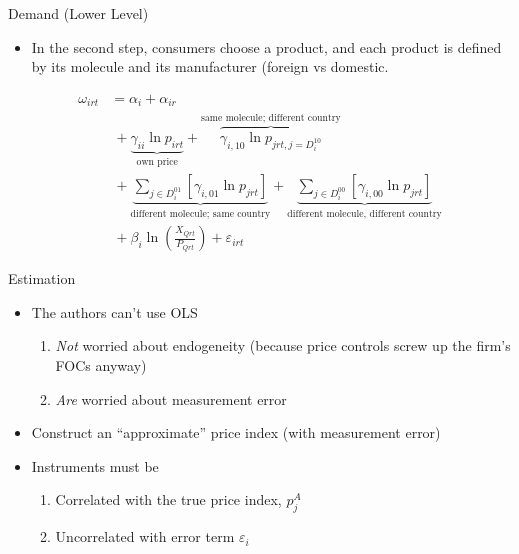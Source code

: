 \documentclass{beamer}
\begin{document}
%
\begin{frame}{Demand (Lower Level)}
  \begin{itemize}
  \item In the second step, consumers choose a product, and each product is defined by its molecule and its manufacturer (foreign vs domestic.
  \end{itemize}
  \begin{align*}
    \omega_{irt} &= \alpha_i + \alpha_{ir} \\
                 &\ + \underbrace{\gamma_{ii} \ln  p_{irt}}_{\text{own price}} + \overbrace{\gamma_{i, 10} \ln p_{jrt, j = D_i^{10}}}^{\text{same molecule; different country}}\\
                 &\ + \underbrace{\sum_{j \in D_i^{01}}[\gamma_{i, 01} \ln p_{jrt}]}_{\text{different molecule; same country}} + \underbrace{\sum_{j \in D_i^{00}}[\gamma_{i, 00} \ln p_{jrt}]}_{\text{different molecule, different country}}\\
    &\ + \beta_i \ln \left(\frac{X_{Qrt}}{P_{Qrt}}\right) + \varepsilon_{irt} %
  \end{align*}
\end{frame}
%
\begin{frame}{Estimation}
  \begin{itemize}
  \item The authors can't use OLS
    \begin{enumerate}
    \item \emph{Not} worried about endogeneity (because price controls screw up the firm's FOCs anyway)
      \item \emph{Are} worried about measurement error
    \end{enumerate}
    \vfill
  \item Construct an ``approximate'' price index (with measurement error)
    \vfill
  \item Instruments must be
    \begin{enumerate}
    \item Correlated with the true price index, $p_j^A$
      \item Uncorrelated with error term $\varepsilon_i$
    \end{enumerate}
  \end{itemize}
\end{frame}
%
\end{document}
